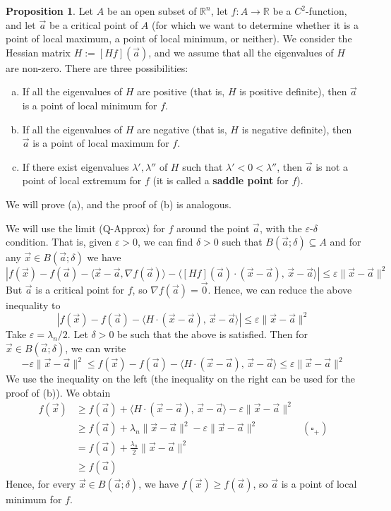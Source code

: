 \documentclass[11pt]{article}
\makeatletter
\theoremstyle{definition}
\newtheorem{prop}[thm]{Proposition}
\newcommand{\R}{\ensuremath{\mathbb{R}}}
\newenvironment{pf}[1][\proofname]{\par
  \pushQED{\qed}%
  \normalfont \topsep0\p@\relax
  \trivlist
  \item[\hskip\labelsep\itshape
  #1\@addpunct{.}]\ignorespaces
}{%
  \popQED\endtrivlist\@endpefalse
}
\makeatother
\begin{document}
\begin{prop}
Let $A$ be an open subset of $\R^n$, let $f : A \to \R$ be a $C^2$-function, and let $\vec{a}$ be a critical point of $A$ (for which we want to determine whether it is a point of local maximum, a point of local minimum, or neither). We consider the Hessian matrix $H := [Hf](\vec{a})$, and we assume that all the eigenvalues of $H$ are non-zero. There are three possibilities:\vspace{-1.5ex}
\begin{enumerate}[(a)]
\item If all the eigenvalues of $H$ are positive (that is, $H$ is positive definite), then $\vec{a}$ is a point of local minimum for $f$.
\item If all the eigenvalues of $H$ are negative (that is, $H$ is negative definite), then $\vec{a}$ is a point of local maximum for $f$.
\item If there exist eigenvalues $\lambda', \lambda''$ of $H$ such that $\lambda' < 0 < \lambda''$, then $\vec{a}$ is not a point of local extremum for $f$ (it is called a {\bf saddle point} for $f$).
\end{enumerate}
\begin{pf}
We will prove (a), and the proof of (b) is analogous.

We will use the limit (Q-Approx) for $f$ around the point $\vec{a}$, with the $\varepsilon$-$\delta$ condition. That is, given $\varepsilon > 0$, we can find $\delta > 0$ such that $B(\vec{a}; \delta) \subseteq A$ and for any $\vec{x} \in B(\vec{a}; \delta)$ we have
$$|f(\vec{x}) - f(\vec{a}) - \langle \vec{x} - \vec{a}, \nabla f(\vec{a}) \rangle - \langle [Hf](\vec{a}) \cdot (\vec{x} - \vec{a}),\, \vec{x} - \vec{a} \rangle| \leq \varepsilon \|\vec{x} - \vec{a}\|^2$$
But $\vec{a}$ is a critical point for $f$, so $\nabla f(\vec{a}) = \vec{0}$. Hence, we can reduce the above inequality to
$$|f(\vec{x}) - f(\vec{a}) - \langle H \cdot (\vec{x} - \vec{a}),\, \vec{x} - \vec{a} \rangle| \leq \varepsilon \|\vec{x} - \vec{a}\|^2$$
Take $\varepsilon = \lambda_n / 2$. Let $\delta > 0$ be such that the above is satisfied. Then for $\vec{x} \in B(\vec{a}; \delta)$, we can write
$$-\varepsilon \|\vec{x} - \vec{a}\|^2 \leq f(\vec{x}) - f(\vec{a}) - \langle H \cdot (\vec{x} - \vec{a}),\, \vec{x} - \vec{a} \rangle \leq \varepsilon \|\vec{x} - \vec{a}\|^2$$
We use the inequality on the left (the inequality on the right can be used for the proof of (b)). We obtain
\begin{align*}
f(\vec{x}) &\geq f(\vec{a}) + \langle H \cdot (\vec{x} - \vec{a}),\, \vec{x} - \vec{a} \rangle - \varepsilon\|\vec{x} - \vec{a}\|^2 \\
&\geq f(\vec{a}) + \lambda_n \|\vec{x} - \vec{a}\|^2 - \varepsilon \|\vec{x} - \vec{a}\|^2 & (\square_+) \\
&= f(\vec{a}) + \tfrac{\lambda_n}2\|\vec{x} - \vec{a}\|^2 \\
&\geq f(\vec{a})
\end{align*}
Hence, for every $\vec{x} \in B(\vec{a}; \delta)$, we have $f(\vec{x}) \geq f(\vec{a})$, so $\vec{a}$ is a point of local minimum for $f$.


\end{pf}
\end{prop}
\end{document}
